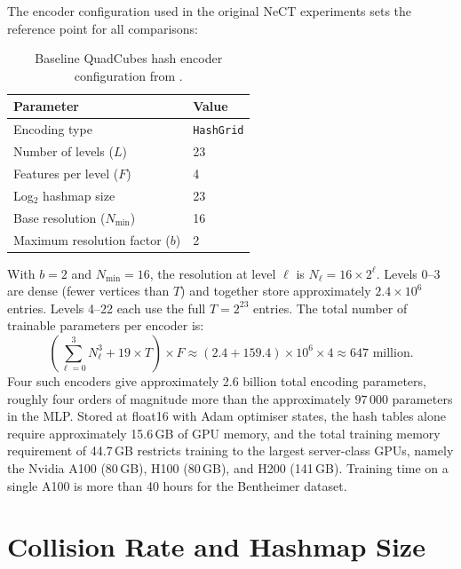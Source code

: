 \documentclass[12pt, a4paper, twoside]{report}
\begin{document}
The encoder configuration used in the original NeCT experiments sets the reference point for all comparisons:

\begin{table}[h]
    \centering
    \caption{Baseline QuadCubes hash encoder configuration from \citet{friis2025nect}.}
    \label{tab:baseline_config}
    \begin{tabular}{ll}
        \toprule
        Parameter & Value \\
        \midrule
        Encoding type & \texttt{HashGrid} \\
        Number of levels ($L$) & 23 \\
        Features per level ($F$) & 4 \\
        Log$_2$ hashmap size & 23 \\
        Base resolution ($N_\mathrm{min}$) & 16 \\
        Maximum resolution factor ($b$) & 2 \\
        \bottomrule
    \end{tabular}
\end{table}

With $b = 2$ and $N_\mathrm{min} = 16$, the resolution at level $\ell$ is $N_\ell = 16 \times 2^\ell$. Levels 0--3 are dense (fewer vertices than $T$) and together store approximately $2.4 \times 10^6$ entries. Levels 4--22 each use the full $T = 2^{23}$ entries. The total number of trainable parameters per encoder is:
%
\begin{equation}
    \left(\sum_{\ell=0}^{3} N_\ell^3 + 19 \times T\right) \times F
    \approx (2.4 + 159.4) \times 10^6 \times 4
    \approx 647 \text{ million.}
    \label{eq:params_per_encoder}
\end{equation}
%
Four such encoders give approximately 2.6 billion total encoding parameters, roughly four orders of magnitude more than the approximately $97\,000$ parameters in the MLP. Stored at float16 with Adam optimiser states, the hash tables alone require approximately 15.6\,GB of GPU memory, and the total training memory requirement of 44.7\,GB restricts training to the largest server-class GPUs, namely the Nvidia A100 (80\,GB), H100 (80\,GB), and H200 (141\,GB). Training time on a single A100 is more than 40 hours for the Bentheimer dataset.

\section{Collision Rate and Hashmap Size}
\label{sec:collision_and_dim}
\end{document}
